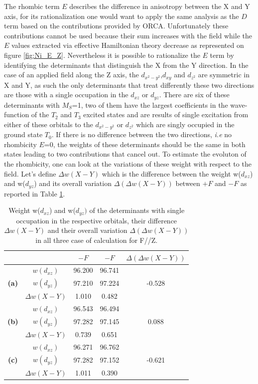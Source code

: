 \documentclass[10pt]{report}
\numberwithin{equation}{section}
\begin{document}
The rhombic term $E$ describes the difference in anisotropy between the X and Y axis, for its rationalization one would want to apply the same analysis as the $D$ term based on the contributions provided by ORCA.
Unfortunately these contributions cannot be used because their sum increases with the field while the $E$ values extracted via effective Hamiltonian theory decrease as represented on figure \ref{fig:Ni_E_Z}.
Nevertheless it is possible to rationalize the $E$ term by identifying the determinants that distinguish the X from the Y direction. 
In the case of an applied field along the Z axis, the $d_{x^2-y^2}$,$d_{xy}$ and $d_{z^2}$ are symmetric in X and Y, as such the only determinants that treat differently these two directions are those with a single occupation in the $d_{xz}$ or $d_{yz}$.
There are six of these determinants with $M_S$=1, two of them have the largest coefficients in the wave-function of the $T_2$ and $T_3$ excited states and are results of single excitation from either of these orbitals to the $d_{x^2-y^2}$ or $d_{z^2}$ which are singly occupied in the ground state $T_0$.
If there is no difference between the two directions, \textit{i.e} no rhombicity $E$=0, the weights of these determinants should be the same in both states leading to two contributions that cancel out. 
To estimate the evoluton of the rhombicity, one can look at the variations of these weight with respect to the field.
Let's define $\Delta w(X-Y)$ which is the difference between the weight w($d_{xz}$) and w($d_{yz}$) and its overall variation $\Delta (\Delta w(X-Y))$ between $+F$ and $-F$ as reported in Table \ref{tab:PoidsZ}.

\begin{table}[h]
    \centering
    \begin{tabular}{c | c | c c | c }
        & &  $-F$ & $-F$ & $\Delta (\Delta w(X-Y))$\\
        \hline
        \multirow{3}{*}{\textbf{(a)}}
        &$w(d_{xz})$ &  96.200 & 96.741 & \\
        &$w(d_{yz})$ &  97.210 & 97.224 & -0.528\\
        &$\Delta w(X-Y)$ & 1.010 & 0.482& \\
        \hline
        \multirow{3}{*}{\textbf{(b)}}
        &$w(d_{xz})$ &  96.543 & 96.494 & \\
        &$w(d_{yz})$ &  97.282 & 97.145 & 0.088\\
        &$\Delta w(X-Y)$ & 0.739 & 0.651& \\
        \hline
        \multirow{3}{*}{\textbf{(c)}}
        &$w(d_{xz})$ &  96.271 & 96.762 & \\
        &$w(d_{yz})$ &  97.282 & 97.152 & -0.621\\
        &$\Delta w(X-Y)$ & 1.011 & 0.390& \\
        \hline
    \end{tabular}
    \caption{Weight w($d_{xz}$) and w($d_{yz})$ of the determinants with single occupation in the respective orbitals, their difference $\Delta w(X-Y)$ and their overall variation $\Delta (\Delta w(X-Y))$ in all three case of calculation for F//Z. }
    \label{tab:PoidsZ}
\end{table}
\end{document}
